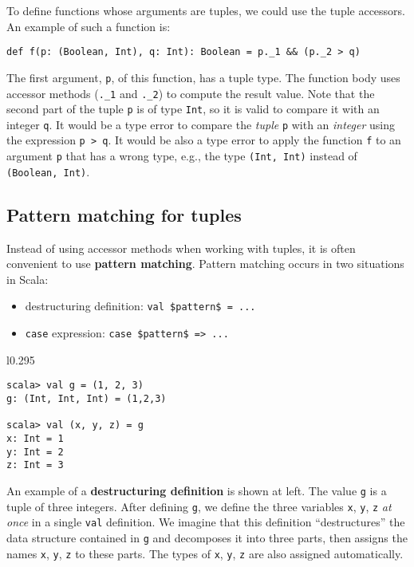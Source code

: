 To define functions whose arguments are tuples, we could use the tuple
accessors. An example of such a function is:
\begin{lstlisting}
def f(p: (Boolean, Int), q: Int): Boolean = p._1 && (p._2 > q) 
\end{lstlisting}
The first argument, \lstinline!p!, of this function, has a tuple
type. The function body uses accessor methods (\lstinline!._1! and
\lstinline!._2!) to compute the result value. Note that the second
part of the tuple \lstinline!p! is of type \lstinline!Int!, so it
is valid to compare it with an integer \lstinline!q!. It would be
a type error to compare the \emph{tuple} \lstinline!p!
with an \emph{integer} using the expression \lstinline!p > q!. It
would be also a type error to apply the function \lstinline!f! to
an argument \lstinline!p! that has a wrong type, e.g., the type \lstinline!(Int, Int)!
instead of \lstinline!(Boolean, Int)!.

\subsection{Pattern matching for tuples}

Instead of using accessor methods when working with tuples, it is
often convenient to use \textbf{pattern matching}.
Pattern matching occurs in two situations in Scala:
\begin{itemize}
\item destructuring definition: \lstinline[mathescape=true]!val $pattern$ = ...!
\item \lstinline!case! expression: \lstinline[mathescape=true]!case $pattern$ => ...!
\end{itemize}
\begin{wrapfigure}{l}{0.295\columnwidth}%
\vspace{-0.8\baselineskip}
\begin{lstlisting}
scala> val g = (1, 2, 3)
g: (Int, Int, Int) = (1,2,3)

scala> val (x, y, z) = g
x: Int = 1
y: Int = 2
z: Int = 3
\end{lstlisting}
\vspace{-1.5\baselineskip}
\end{wrapfigure}%

An example of a \textbf{destructuring definition}
is shown at left. The value \lstinline!g! is a tuple of three integers.
After defining \lstinline!g!, we define the three variables \lstinline!x!,
\lstinline!y!, \lstinline!z! \emph{at once} in a single \lstinline!val!
definition. We imagine that this definition \textsf{``}destructures\textsf{''} the
data structure contained in \lstinline!g! and decomposes it into
three parts, then assigns the names \lstinline!x!, \lstinline!y!,
\lstinline!z! to these parts. The types of \lstinline!x!, \lstinline!y!,
\lstinline!z! are also assigned automatically.

